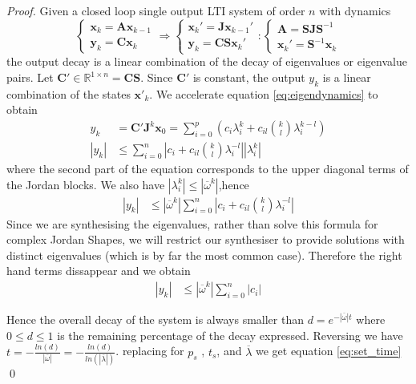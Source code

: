 \documentclass[sigconf]{llncs}
\newcommand{\mat}[1]{\boldsymbol{#1}}
\renewcommand{\vec}[1]{\boldsymbol{#1}}
\begin{document}
\begin{proof}
Given a closed loop single output LTI system of order $n$ with dynamics
\begin{equation}
\left\{\begin{array}{c}\vec{x}_k=\mat{A}\vec{x}_{k-1}\\ \vec{y}_k=\mat{C}\vec{x}_k\end{array}\right. \Rightarrow \left\{ \begin{array}{c}\vec{x}_k'=\mat{J}\vec{x}_{k-1}'\\ \vec{y}_k=\mat{C}\mat{S}\vec{x}_k'\end{array}\right. : \left\{ \begin{array}{c}\mat{A}=\mat{S}\mat{J}\mat{S}^{-1} \\ \vec{x}_k'=\mat{S}^{-1}\vec{x}_k\end{array}\right.
\label{eq:eigendynamics}
\end{equation}
%
the output decay is a linear combination of the decay of eigenvalues or
eigenvalue pairs.  Let $\mat{C}'\in \mathbb{R}^{1 \times n}=\mat{C}\mat{S}$. 
Since $\mat{C}'$ is constant, the output $y_k$ is a linear combination of
the states $\vec{x}'_k$.  We accelerate equation \eqref{eq:eigendynamics} to
obtain
%
\begin{align}
y_k&=\mat{C}'\mat{J}^k\vec{x}_0 = \sum_{i=0}^p \left( c_i \lambda_i^k + c_{il}\binom{k}{l} \lambda_i^{k-l}\right)\\
|y_k|&\leq \sum_{i=0}^n \left|c_i + c_{il}\binom{k}{l} \lambda_i^{-l}\right||\lambda_i^k|
\end{align}
%
where the second  part of the equation corresponds to the upper diagonal
terms of the Jordan blocks.  We also have $|\lambda_i^k|\leq
|\overline{\omega}^k|$,hence
%
\begin{align}
|y_k|&\leq |\overline{\omega}^k|\sum_{i=0}^n \left|c_i + c_{il}\binom{k}{l} \lambda_i^{-l}\right|
\end{align}
%
Since we are synthesising the eigenvalues, rather than solve this formula
for complex Jordan Shapes, we will restrict our synthesiser to provide
solutions with distinct eigenvalues (which is by far the most common case). 
Therefore the right hand terms dissappear and we obtain
%
\begin{align}
|y_k|&\leq |\overline{\omega}^k|\sum_{i=0}^n |c_i|
\end{align}

Hence the overall decay of the system is always smaller
than $d=e^{-|\overline{\omega}| t}$ where $0\leq d\leq 1$ is the remaining
percentage of the decay expressed.  Reversing we have
$t=-\frac{ln(d)}{|\overline{\omega}|}=-\frac{ln(d)}{ln(|\overline{\lambda}|)}$. 
replacing for $p_s$ , $t_s$, and $\overline{\lambda}$ we get equation
\eqref{eq:set_time}
%
\qed
\end{proof}
\end{document}
